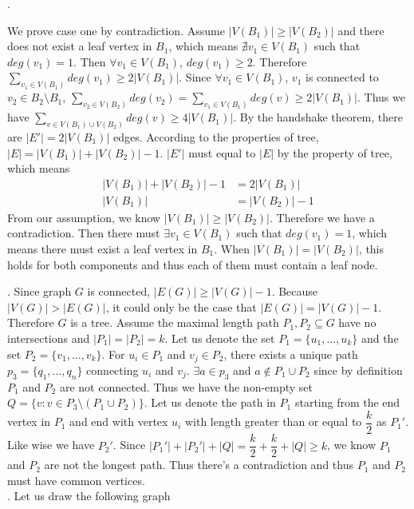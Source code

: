 \documentclass[12pt]{article}
\begin{document}
	. 
	
	We prove case one by contradiction. Assume $|V(B_1)| \geq |V(B_2)|$ and there does not exist a leaf vertex in $B_1$, which means $\nexists v_1 \in V(B_1)$ such that $deg(v_1) = 1$. Then $\forall v_1 \in V(B_1)$, $deg(v_1) \geq 2$. Therefore $\sum_{v_1 \in V(B_1)} deg(v_1) \geq 2|V(B_1)|$. Since $\forall v_1 \in V(B_1)$, $v_1$ is connected to $v_2 \in B_2 \setminus B_1$, $\sum_{v_2 \in V(B_2)} deg(v_2) = \sum_{v_1 \in V(B_1)} deg(v) \geq 2|V(B_1)|$. Thus we have $\sum_{v \in V(B_1) \cup V(B_2)} deg(v) \geq 4|V(B_1)|$. By the handshake theorem, there are $|E'| = 2|V(B_1)|$ edges. According to the properties of tree, $|E| = |V(B_1)|+|V(B_2)|-1$. $|E'|$ must equal to $|E|$ by the property of tree, which means
	\begin{align*}
		|V(B_1)|+|V(B_2)|-1 &=  2|V(B_1)|\\
		|V(B_1)| &= |V(B_2)|-1
	\end{align*}
	From our assumption, we know $|V(B_1)| \geq |V(B_2)|$. Therefore we have a contradiction. Then there must $\exists v_1 \in V(B_1)$ such that $deg(v_1) = 1$, which means there must exist a leaf vertex in $B_1$. When $|V(B_1)| = |V(B_2)|$, this holds for both components and thus each of them must contain a leaf node.
	
	\newpage
	
	. Since graph $G$ is connected, $|E(G)| \geq |V(G)|-1$. Because $|V(G)| > |E(G)|$, it could only be the case that $|E(G)| = |V(G)|-1$. Therefore $G$ is a tree. Assume the maximal length path $P_1 ,P_2 \subseteq G$ have no intersections and $|P_1| = |P_2| = k$. Let us denote the set $P_1 = \{u_1,...,u_k\}$ and the set $P_2 = \{v_1,...,v_k\}$. For $u_i \in P_1$ and $v_j \in P_2$, there exists a unique path $p_3 = \{q_1,...,q_n\}$ connecting $u_i$ and $v_j$. $\exists a \in p_3$ and $a \notin P_1 \cup P_2$ since by definition $P_1$ and $P_2$ are not connected. Thus we have the non-empty set $Q = \{v:v\in P_3 \setminus (P_1 \cup P_2)\}$. Let us denote the path in $P_1$ starting from the end vertex in $P_1$ and end with vertex $u_i$ with length greater than or equal to $\dfrac{k}{2}$ as $P_1'$. Like wise we have $P_2'$. Since $|P_1'|+|P_2'|+|Q| = \dfrac{k}{2}+\dfrac{k}{2} +|Q| \geq k$, we know $P_1$ and $P_2$ are not the longest path. Thus there's a contradiction and thus $P_1$ and $P_2$ must have common vertices.\\
	
	. 
	Let us draw the following graph
	
\end{document}
